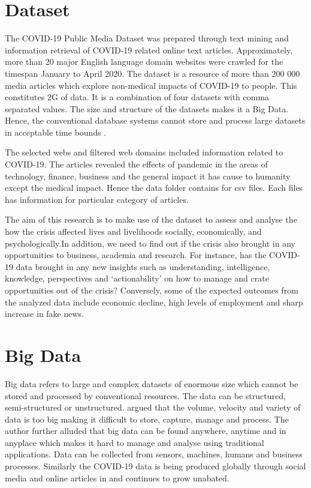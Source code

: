 \documentclass[conference]{IEEEtran}
\begin{document}
\section{Dataset}
The COVID-19 Public Media Dataset was prepared through text mining and information retrieval of COVID-19 related online text articles. Approximately, more than 20 major English language domain websites were crawled for the timespan January to April 2020. The dataset is a resource of more than 200 000 media articles which explore non-medical impacts of COVID-19 to people.  This constitutes 2G of data.   It is a combination of four datasets with comma separated values. The size and structure of the datasets makes it a Big Data. Hence, the conventional database systems cannot store and  process large datasets in acceptable time bounds \cite{Patel et al}. 


The selected webs and filtered web domains included information related to COVID-19. The articles revealed the effects of pandemic in the areas of technology, finance, business and the general impact it has cause to humanity except the medical impact. Hence the data folder contains for csv files. Each files has information for particular category of articles. 

The aim of this research is to make use of the dataset to assess and analyse the how the crisis affected lives and livelihoods socially, economically, and psychologically.In addition, we need to find out if the crisis also brought in any opportunities to business, academia and research.  For instance, has the COVID-19 data brought in any new insights such as understanding, intelligence, knowledge, perspectives and ‘actionability’ on how to manage and crate opportunities out of the crisis? Conversely, some of the expected outcomes from the analyzed data include economic decline, high levels of employment and sharp increase in fake news.  

\section{Big Data}
Big data refers to large and complex datasets of enormous size which cannot   be stored and processed by conventional resources\cite{Grolinger}. The data can be structured, semi-structured or unstructured. \cite{Owais} argued that the volume, velocity and variety of data is too big making it difficult to store, capture, manage and process. The author further alluded that big data can be found anywhere, anytime and in anyplace which makes it hard to manage and analyse using traditional applications. Data can be collected from sensors, machines, humans and business processes. Similarly the COVID-19 data is being produced globally through social media and online articles in and continues to grow unabated.
\end{document}
